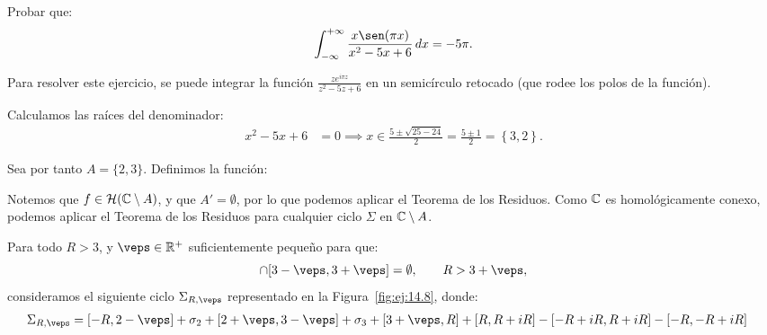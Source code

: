 \begin{ejercicio}\label{ej:14.8}
    Probar que:
    \begin{equation*}
        \int_{-\infty}^{+\infty} \frac{x\sen(\pi x)}{x^2-5x+6} \, dx = -5\pi.
    \end{equation*}
    \begin{observacion}
        Para resolver este ejercicio, se puede integrar la función $\frac{ze^{i\pi z}}{z^2-5z+6}$ en un semicírculo retocado (que rodee los polos de la función).
    \end{observacion}

    Calculamos las raíces del denominador:
    \begin{align*}
        x^2 - 5x + 6 &= 0 \implies x \in \frac{5\pm\sqrt{25 - 24}}{2} = \frac{5\pm 1}{2} = \left\{3, 2\right\}.
    \end{align*}

    Sea por tanto $A = \{2, 3\}$. Definimos la función:

    Notemos que $f\in \mathcal{H}(\mathbb{C}\setminus A)$, y que $A'=\emptyset$, por lo que podemos aplicar el Teorema de los Residuos. Como $\mathbb{C}$ es homológicamente conexo, podemos aplicar el Teorema de los Residuos para cualquier ciclo $\Sigma$ en $\mathbb{C}\setminus A$.

    Para todo $R > 3$, y $\veps\in \bb{R}^+$ suficientemente pequeño para que:
    \begin{equation*}
        [2-\veps, 2+\veps] \cap [3-\veps, 3+\veps] = \emptyset,
        \qquad R > 3 + \veps,
    \end{equation*}
    consideramos el siguiente ciclo $\Sigma_{R,\veps}$ representado en la Figura~\ref{fig:ej:14.8}, donde:
    \begin{align*}
        \Sigma_{R,\veps} &= [-R, 2-\veps] + \sigma_{2} + [2+\veps, 3-\veps] + \sigma_{3} + [3+\veps, R] + [R, R+iR] - [-R+iR, R+iR] - [-R, -R + iR]
    \end{align*}
    \begin{figure}
        \centering
\end{figure}
\end{ejercicio}
